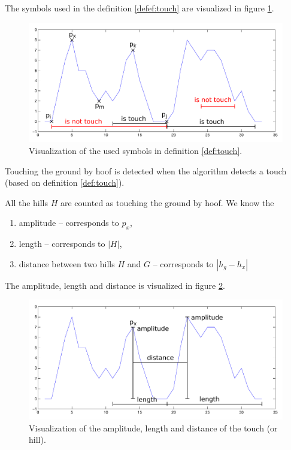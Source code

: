 \begin{remark}
    The symbols used in the definition \ref{defef:touch} are visualized in figure \ref{fig:touchDefinition}.
\end{remark}

\begin{figure}
    \centering
    \label{fig:touchDefinition}
    \caption{Visualization of the used symbols in definition \ref{def:touch}.}
    \includegraphics[width=\linewidth]{img/touchHillDefinition.pdf}
\end{figure}

Touching the ground by hoof is detected when the algorithm detects a touch (based on definition \ref{def:touch}).

All the hills $H$ are counted as touching the ground by hoof. We know the
\begin{enumerate}
    \item amplitude -- corresponds to $p_x$,
    \item length -- corresponds to $|H|$,
    \item distance between two hills $H$ and $G$ -- corresponds to $|h_g - h_x|$
\end{enumerate}
The amplitude, length and distance is visualized in figure \ref{fig:touchProperties}.

\begin{figure}
    \centering
    \label{fig:touchProperties}
    \caption{Visualization of the amplitude, length and distance of the touch (or hill).}
    \includegraphics[width=\linewidth]{img/touchHillProperties.pdf}
\end{figure}

